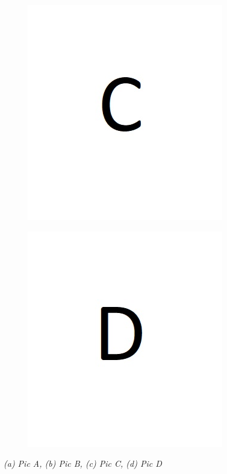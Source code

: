 \documentclass[a4paper]{article}
\begin{document}
\begin{figure}[h]
	\begin{subfigure}[b]{0.4\textwidth}
		\includegraphics[width=0.5\linewidth]{C} 
		\caption{}
		\label{fig:subplot_C}
	\end{subfigure}
	\hfill
	\begin{subfigure}[b]{0.4\textwidth}
		\includegraphics[width=0.5\linewidth]{D} 
		\caption{}
		\label{fig:subplot_D}
	\end{subfigure}
	
	\caption{\textit{(a) Pic A, (b) Pic B, (c) Pic C, (d) Pic D}}
	\label{fig:subplot}
\end{figure}
\end{document}
